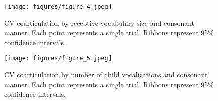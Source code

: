 \documentclass[a4paper,man,natbib,donotrepeattitle, apacite]{apa6}
\begin{document}
\begin{figure}[H]
\centering
\texttt{[image: figures/figure\_4.jpeg]}
\caption{\label{fig:figure-4}CV coarticulation by receptive vocabulary size and consonant manner. Each point represents a single trial. Ribbons represent 95\% confidence intervals.}
\end{figure}

\begin{figure}[H]
\centering
\texttt{[image: figures/figure\_5.jpeg]}
\caption{\label{fig:figure-5}CV coarticulation by number of child vocalizations and consonant manner. Each point represents a single trial. Ribbons represent 95\% confidence intervals.}
\end{figure}
\end{document}
